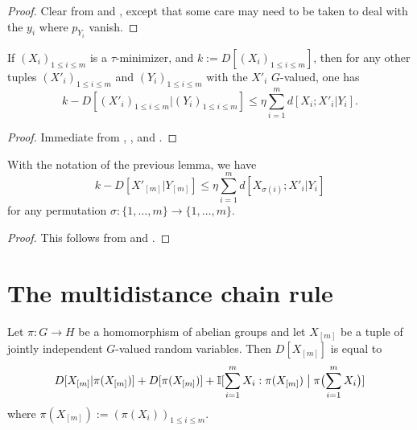 \begin{proof}\leanok Clear from  and , except that some care may need to be taken to deal with the $y_i$ where $p_{Y_i}$ vanish.
\end{proof}


\begin{lemma}\label{cond-multidist-lower}\leanok  If  $(X_i)_{1 \leq i \leq m}$ is a $\tau$-minimizer, and $k := D[(X_i)_{1 \leq i \leq m}]$, then for any other tuples $(X'_i)_{1 \leq i \leq m}$ and $(Y_i)_{1 \leq i \leq m}$ with the $X'_i$ $G$-valued, one has
  $$ k - D[(X'_i)_{1 \leq i \leq m} | (Y_i)_{1 \leq i \leq m}] \leq \eta \sum_{i=1}^m d[X_i; X'_i|Y_i].$$
\end{lemma}

\begin{proof}\leanok
  Immediate from , , and .
\end{proof}

\begin{corollary}\label{cond-multidist-lower-II}\leanok With the notation of the previous lemma, we have
  \begin{equation}\label{5.3-conv}
    k - D[ X'_{[m]} | Y_{[m]} ] \leq \eta \sum_{i=1}^m d[X_{\sigma(i)};X'_i|Y_i]
  \end{equation}
for any permutation $\sigma : \{1,\dots,m\} \rightarrow \{1,\dots,m\}$.
\end{corollary}

\begin{proof}\leanok  This follows from  and .
\end{proof}

\section{The multidistance chain rule}

\begin{lemma}\label{multidist-chain-rule}\leanok  Let $\pi \colon G \to H$ be a homomorphism of abelian groups and let $X_{[m]}$ be a tuple of jointly independent $G$-valued random variables.  Then $D[X_{[m]}]$ is equal to
  \begin{equation}
      D[ X_{[m]} | \pi(X_{[m]}) ]  +D[ \pi(X_{[m]}) ]  + \mathbb{I}[ \sum_{i=1}^m X_i  : \pi(X_{[m]}) \; \big| \; \pi\bigl(\sum_{i=1}^m X_i\bigr) ]
    \label{chain-eq}
  \end{equation}
  where $\pi(X_{[m]}) := (\pi(X_i))_{1 \leq i \leq m}$.
  \end{lemma}

